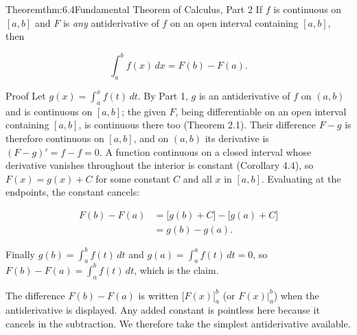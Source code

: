 \documentclass[a4paper,12pt,oneside]{memoir}
\begin{document}
\begin{envtheorem}{Theorem}{thm:6.4}{Fundamental Theorem of Calculus, Part 2}
If \(f\) is continuous on \([a, b]\) and \(F\) is \emph{any} antiderivative of \(f\) on an open interval containing \([a, b]\), then

\[ \int_{a}^{b} f(x)\,dx = F(b) - F(a). \]
\end{envtheorem}
\begin{envproof}{Proof}{}{}
Let \(g(x) = \int_{a}^{x} f(t)\,dt\). By Part 1, \(g\) is an antiderivative of \(f\) on \((a, b)\) and is continuous on \([a, b]\); the given \(F\), being differentiable on an open interval containing \([a, b]\), is continuous there too (Theorem 2.1). Their difference \(F - g\) is therefore continuous on \([a, b]\), and on \((a, b)\) its derivative is \((F - g)' = f - f = 0\). A function continuous on a closed interval whose derivative vanishes throughout the interior is constant (Corollary 4.4), so \(F(x) = g(x) + C\) for some constant \(C\) and all \(x\) in \([a, b]\). Evaluating at the endpoints, the constant cancels:

\[ \begin{aligned}
        F(b) - F(a) &= \bigl[g(b) + C\bigr] - \bigl[g(a) + C\bigr] \\[2pt]
                    &= g(b) - g(a).
      \end{aligned} \]

Finally \(g(b) = \int_{a}^{b} f(t)\,dt\) and \(g(a) = \int_{a}^{a} f(t)\,dt = 0\), so \(F(b) - F(a) = \int_{a}^{b} f(t)\,dt\), which is the claim. \qedmark
\end{envproof}
The difference \(F(b) - F(a)\) is written \(\bigl[F(x)\bigr]_{a}^{b}\) (or \(F(x)\big|_{a}^{b}\)) when the antiderivative is displayed. Any added constant is pointless here because it cancels in the subtraction. We therefore take the simplest antiderivative available.
\end{document}
